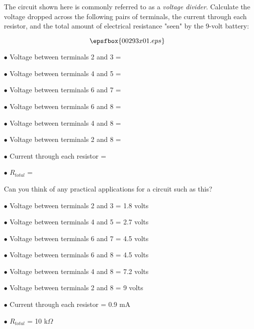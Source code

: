

The circuit shown here is commonly referred to as a {\it voltage divider}.  Calculate the voltage dropped across the following pairs of terminals, the current through each resistor, and the total amount of electrical resistance "seen" by the 9-volt battery:

$$\epsfbox{00293x01.eps}$$

\medskip
\item{$\bullet$} Voltage between terminals 2 and 3 = 
\item{$\bullet$} Voltage between terminals 4 and 5 = 
\item{$\bullet$} Voltage between terminals 6 and 7 = 
\item{$\bullet$} Voltage between terminals 6 and 8 = 
\item{$\bullet$} Voltage between terminals 4 and 8 = 
\item{$\bullet$} Voltage between terminals 2 and 8 = 
\item{$\bullet$} Current through each resistor =
\item{$\bullet$} $R_{total}$ = 
\medskip

Can you think of any practical applications for a circuit such as this?







\medskip
\item{$\bullet$} Voltage between terminals 2 and 3 = 1.8 volts
\item{$\bullet$} Voltage between terminals 4 and 5 = 2.7 volts
\item{$\bullet$} Voltage between terminals 6 and 7 = 4.5 volts
\item{$\bullet$} Voltage between terminals 6 and 8 = 4.5 volts
\item{$\bullet$} Voltage between terminals 4 and 8 = 7.2 volts
\item{$\bullet$} Voltage between terminals 2 and 8 = 9 volts
\item{$\bullet$} Current through each resistor = 0.9 mA
\item{$\bullet$} $R_{total}$ = 10 k$\Omega$
\medskip


